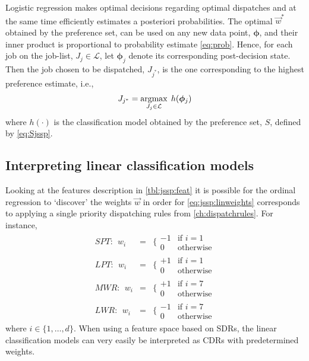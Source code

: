 \documentclass[smallextended]{svjour3}
\renewcommand{\vphi}{\bm \phi}
\begin{document}
	Logistic regression makes optimal decisions regarding optimal dispatches and at the same time efficiently estimates a posteriori probabilities. The optimal $\vec{w}^*$ obtained by the preference set, can be used on any new data point, $\vphi$, and their inner product is proportional to probability estimate \cref{eq:prob}. Hence, for each job on the job-list, $J_j\in\mathcal{L}$, let $\vphi_j$ denote its corresponding  post-decision state. Then the job chosen to be dispatched, $J_{j^*}$, is the one corresponding to the highest preference estimate, i.e.,
	\begin{equation}\label{eq:lin}
	J_{j^*}=\argmax_{J_j\in \mathcal{L}}\; h(\vphi_j)
	\end{equation}
	where $h(\cdot)$ is the classification model obtained by the preference set, $S$, defined by \eqref{eq:Sjssp}. 
	
	\subsection{Interpreting linear classification models}\label{sec:learningmodels:interpret}
	Looking at the features description in \cref{tbl:jssp:feat} it is possible for the ordinal regression to `discover' the weights $\vec{w}$ in order for \eqref{eq:jssp:linweights} corresponds to applying a single priority dispatching rules from \cref{ch:dispatchrules}. For instance, 
	\begin{eqnarray*} %
	SPT:~~w_i&=&\bigg\{ \begin{array}{rl}-1&\text{if }i=1\\0&\text{otherwise}\end{array} \\
	LPT:~~w_i&=&\bigg\{ \begin{array}{rl}+1&\text{if }i=1\\0&\text{otherwise}\end{array} \\
	MWR:~~w_i&=&\bigg\{ \begin{array}{rl}+1&\text{if }i=7\\0&\text{otherwise}\end{array} \\
	LWR:~~w_i&=&\bigg\{ \begin{array}{rl}-1&\text{if }i=7\\0&\text{otherwise}\end{array}
	\end{eqnarray*}
	where $i\in\{1,\ldots,d\}$. %
	When using a feature space based on SDRs, the linear classification models can very easily be interpreted as CDRs with predetermined weights.
	
\end{document}
